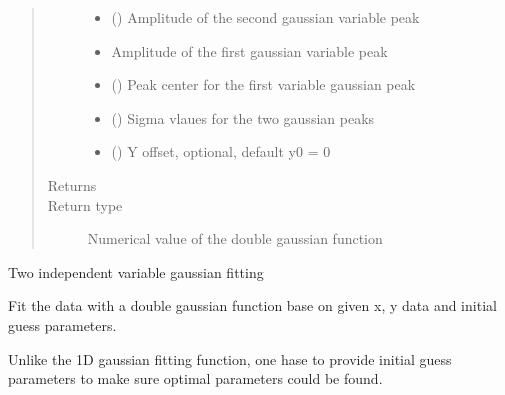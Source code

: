 \documentclass[letterpaper,10pt,english]{sphinxmanual}
\begin{document}
\begin{fulllineitems}
\begin{fulllineitems}
\begin{quote}
\begin{description}
\begin{itemize}
\item {} 
 () \textendash{} Amplitude of the second gaussian variable peak

\item {} 
 \textendash{} Amplitude of the first gaussian variable peak

\item {} 
 () \textendash{} Peak center for the first variable gaussian peak

\item {} 
 () \textendash{} Sigma vlaues for the two gaussian peaks

\item {} 
 () \textendash{} Y offset, optional, default y0 = 0

\end{itemize}

\item[{Returns}] \leavevmode


\item[{Return type}] \leavevmode
Numerical value of the double gaussian function

\end{description}\end{quote}

\end{fulllineitems}


\begin{fulllineitems}
\label{\detokenize{scibeam.core:scibeam.core.gaussian.Gaussian.doubleGausFit}}
Two independent variable gaussian fitting

Fit the data with a double gaussian function base on given
x, y data and initial guess parameters.

Unlike the 1D gaussian fitting function, one hase to provide
initial guess parameters to make sure optimal parameters could
be found.


\end{fulllineitems}
\end{fulllineitems}
\end{document}
